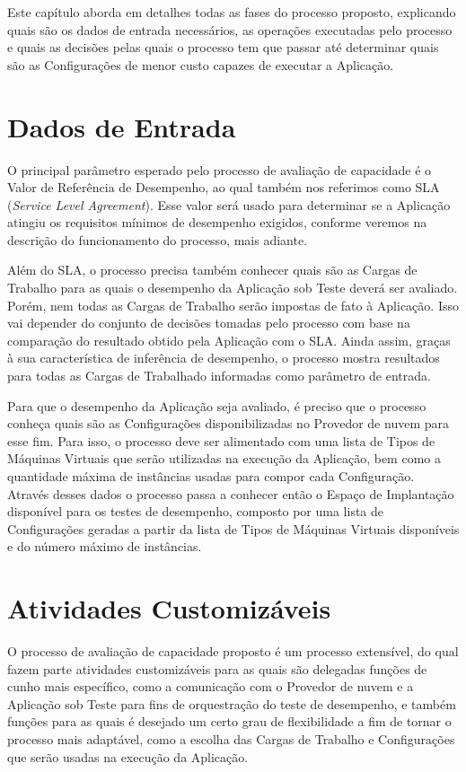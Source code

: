 Este capítulo aborda em detalhes todas as fases do processo 
proposto, explicando quais são os dados de entrada necessários, as operações 
executadas pelo processo e quais as decisões pelas quais o processo tem que 
passar até determinar quais são as Configurações de menor custo capazes de 
executar a Aplicação.

\section{Dados de Entrada}

O principal parâmetro esperado pelo processo de avaliação de capacidade é o Valor
de Referência de Desempenho, ao qual também nos referimos como SLA 
(\emph{Service Level Agreement}). Esse valor será usado para determinar 
se a Aplicação atingiu os requisitos mínimos de desempenho exigidos, conforme
veremos na descrição do funcionamento do processo, mais adiante.

Além do SLA, o processo precisa também conhecer quais são as Cargas de Trabalho
para as quais o desempenho da Aplicação sob Teste deverá ser avaliado. Porém,
nem todas as Cargas de Trabalho serão impostas de fato à Aplicação. Isso vai 
depender do conjunto de decisões tomadas pelo processo com base na comparação do 
resultado obtido pela Aplicação com o SLA. Ainda assim, graças à sua característica 
de inferência de desempenho, o processo mostra resultados para todas as Cargas de 
Trabalhado informadas como parâmetro de entrada.

Para que o desempenho da Aplicação seja avaliado, é preciso que o processo conheça 
quais são as Configurações disponibilizadas no Provedor de nuvem para esse fim. 
Para isso, o processo deve ser alimentado com uma lista de Tipos de Máquinas Virtuais 
que serão utilizadas na execução da Aplicação, bem como a quantidade máxima de 
instâncias usadas para compor cada Configuração. Através desses dados o processo
passa a conhecer então o Espaço de Implantação disponível para os testes de 
desempenho, composto por uma lista de Configurações geradas a partir da lista de
Tipos de Máquinas Virtuais disponíveis e do número máximo de instâncias.

\section{Atividades Customizáveis}
O processo de avaliação de capacidade proposto é um processo extensível, do qual
fazem parte atividades customizáveis para as quais são delegadas funções de
cunho mais específico, como a comunicação com o Provedor de nuvem e a Aplicação sob Teste
para fins de orquestração do teste de desempenho, e também funções para as quais
é desejado um certo grau de flexibilidade a fim de tornar o processo mais adaptável,
como a escolha das Cargas de Trabalho e Configurações que serão usadas na execução
da Aplicação.

